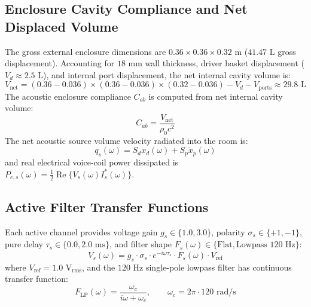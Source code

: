 \documentclass[11pt,a4paper,titlepage]{article}
\begin{document}
\subsection{Enclosure Cavity Compliance and Net Displaced Volume}
The gross external enclosure dimensions are $0.36 \times 0.36 \times 0.32\text{ m}$ ($41.47\text{ L}$ gross displacement). Accounting for $18\text{ mm}$ wall thickness, driver basket displacement ($V_d \approx 2.5\text{ L}$), and internal port displacement, the net internal cavity volume is:
\begin{equation}
    V_{\text{net}} = (0.36 - 0.036) \times (0.36 - 0.036) \times (0.32 - 0.036) - V_d - V_{\text{ports}} \approx 29.8\text{ L}
\end{equation}
The acoustic enclosure compliance $C_{ab}$ is computed from net internal cavity volume:
\begin{equation}
    C_{ab} = \frac{V_{\text{net}}}{\rho_0 c^2}
\end{equation}
The net acoustic source volume velocity radiated into the room is:
\begin{equation}
    q_s(\omega) = S_d \dot{x}_d(\omega) + S_p \dot{x}_p(\omega)
\end{equation}
and real electrical voice-coil power dissipated is $P_{e, s}(\omega) = \frac{1}{2} \operatorname{Re}\{ V_s(\omega) I_s^*(\omega) \}$.

\subsection{Active Filter Transfer Functions}
Each active channel provides voltage gain $g_s \in \{1.0, 3.0\}$, polarity $\sigma_s \in \{+1, -1\}$, pure delay $\tau_s \in \{0.0, 2.0\text{ ms}\}$, and filter shape $F_s(\omega) \in \{\text{Flat}, \text{Lowpass } 120\text{ Hz}\}$:
\begin{equation}
    V_s(\omega) = g_s \cdot \sigma_s \cdot e^{-i \omega \tau_s} \cdot F_s(\omega) \cdot V_{\text{ref}}
\end{equation}
where $V_{\text{ref}} = 1.0\text{ V}_{\text{rms}}$, and the $120\text{ Hz}$ single-pole lowpass filter has continuous transfer function:
\begin{equation}
    F_{\text{LP}}(\omega) = \frac{\omega_c}{i \omega + \omega_c}, \qquad \omega_c = 2 \pi \cdot 120\text{ rad/s}
\end{equation}

\newpage

\end{document}
